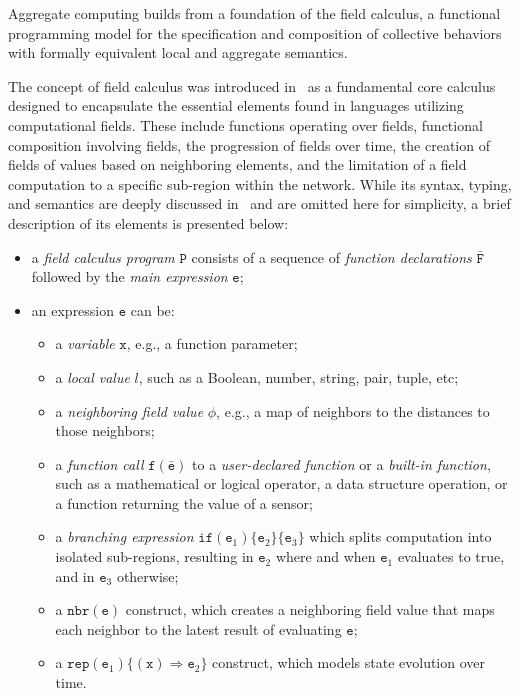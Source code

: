 \documentclass[12pt,a4paper,openright,twoside]{book}
\begin{document}
Aggregate computing builds from a foundation of the field calculus, a functional programming model for the specification and composition of collective behaviors with formally equivalent local and aggregate semantics.

The concept of field calculus was introduced in~\cite{Viroli2013} as a fundamental core calculus designed to encapsulate the essential elements found in languages utilizing computational fields. These include functions operating over fields, functional composition involving fields, the progression of fields over time, the creation of fields of values based on neighboring elements, and the limitation of a field computation to a specific sub-region within the network. While its syntax, typing, and semantics are deeply discussed in~\cite{Viroli2019} and are omitted here for simplicity, a brief description of its elements is presented below:

\begin{itemize}
    \item a \textit{field calculus program} $\texttt{P}$ consists of a sequence of \textit{function declarations} $\bar{\texttt{F}}$ followed by the \textit{main expression} $\texttt{e}$;
    \item an expression $\texttt{e}$ can be:
    \begin{itemize}
        \item a \textit{variable} $\texttt{x}$, e.g., a function parameter;
        \item a \textit{local value} $l$, such as a Boolean, number, string, pair, tuple, etc;
        \item a \textit{neighboring field value} $\phi$, e.g., a map of
        neighbors to the distances to those neighbors;
        \item a \textit{function call} $\texttt{f}(\bar{\texttt{e}})$ to a \textit{user-declared function} or a \textit{built-in function}, such
        as a mathematical or logical operator, a data structure operation, or a function returning the value of a sensor;
        \item a \textit{branching expression} $\texttt{if} (\texttt{e}_1)\{\texttt{e}_2\}\{\texttt{e}_3\}$ which splits computation into isolated sub-regions, resulting in $\texttt{e}_2$ where and when $\texttt{e}_1$ evaluates to true, and in $\texttt{e}_3$ otherwise;
        \item a $\texttt{nbr}(\texttt{e})$ construct, which creates a neighboring field value that maps each neighbor to the latest result of evaluating $\texttt{e}$;
        \item a $\texttt{rep}(\texttt{e}_1)\{(\texttt{x})\Rightarrow \texttt{e}_2\}$ construct, which models state evolution over time.
    \end{itemize}
\end{itemize}
\end{document}
